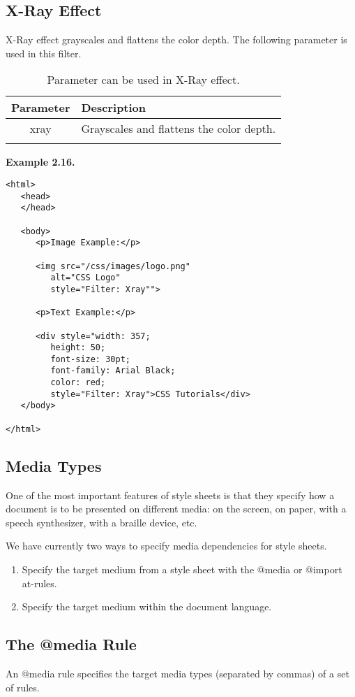 \documentclass[a4paper,oneside]{book}
\numberwithin{equation}{chapter}
\begin{document}
\subsection{X-Ray Effect}
X-Ray effect grayscales and flattens the color depth. The following parameter is used in this filter.
\begin{center}
\begin{longtable}{|c|p{9cm}|}
\hline
\textbf{Parameter} & \textbf{Description}\\
\hline
xray & Grayscales and flattens the color depth.\\
\hline
\caption{Parameter can be used in X-Ray effect.}
\end{longtable}
\end{center}
\textbf{Example 2.16.} 
\begin{verbatim}
<html>
   <head>
   </head>
   
   <body>
      <p>Image Example:</p>
      
      <img src="/css/images/logo.png" 
         alt="CSS Logo" 
         style="Filter: Xray"">
      
      <p>Text Example:</p>
      
      <div style="width: 357; 
         height: 50; 
         font-size: 30pt; 
         font-family: Arial Black; 
         color: red; 
         style="Filter: Xray">CSS Tutorials</div>
   </body>
   
</html>
\end{verbatim}
\subsection{Media Types}
One of the most important features of style sheets is that they specify how a document is to be presented on different media: on the screen, on paper, with a speech synthesizer, with a braille device, etc.

We have currently two ways to specify media dependencies for style sheets.
\begin{enumerate}
\item Specify the target medium from a style sheet with the @media or @import at-rules.
\item Specify the target medium within the document language.
\end{enumerate}
\subsection{The @media Rule}
An @media rule specifies the target media types (separated by commas) of a set of rules.
\end{document}

